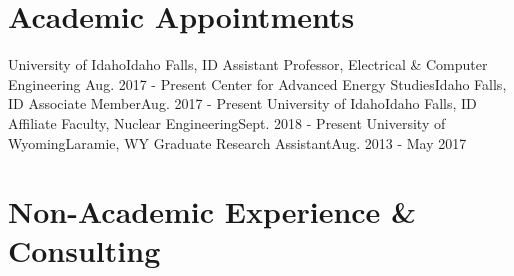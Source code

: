 \section{Academic Appointments}
  \resumeSubHeadingListStart
    \resumeSubheading
      {University of Idaho}{Idaho Falls, ID}
      {Assistant Professor, Electrical \& Computer Engineering }{Aug. 2017 - Present}
    \resumeSubheading
      {Center for Advanced Energy Studies}{Idaho Falls, ID}
      {Associate Member}{Aug. 2017 - Present}
    \resumeSubheading
      {University of Idaho}{Idaho Falls, ID}
      {Affiliate Faculty, Nuclear Engineering}{Sept. 2018 - Present}
     \resumeSubheading
      {University of Wyoming}{Laramie, WY}
      {Graduate Research Assistant}{Aug. 2013 - May 2017}
 \resumeSubHeadingListEnd
 
\section{Non-Academic Experience \& Consulting}
\resumeSubHeadingListStart


 \resumeSubHeadingListEnd

